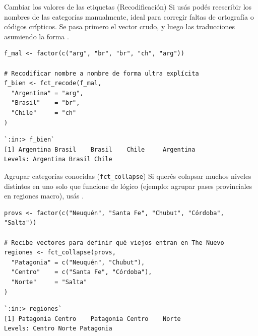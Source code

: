 \documentclass[8pt]{beamer}
\begin{document}
	\begin{frame}[fragile]{Cambiar los valores de las etiquetas (Recodificación)}
		Si usás  podés reescribir los nombres de las categorías manualmente, ideal para corregir faltas de ortografía o códigos crípticos. Se pasa primero el vector crudo, y luego las traducciones asumiendo la forma .
		
\begin{lstlisting}[style=RScript]
f_mal <- factor(c("arg", "br", "br", "ch", "arg"))

# Recodificar nombre a nombre de forma ultra explícita
f_bien <- fct_recode(f_mal,
  "Argentina" = "arg",
  "Brasil"    = "br",
  "Chile"     = "ch"
)
\end{lstlisting}
\begin{lstlisting}[style=RConsole]
`:in:> f_bien`
[1] Argentina Brasil    Brasil    Chile     Argentina
Levels: Argentina Brasil Chile
\end{lstlisting}
	\end{frame}

	\begin{frame}[fragile]{Agrupar categorías conocidas (\texttt{fct\_collapse})}
		Si querés colapsar muchos niveles distintos en uno solo que funcione de  lógico (ejemplo: agrupar pases provinciales en regiones macro), usás .
		
\begin{lstlisting}[style=RScript]
provs <- factor(c("Neuquén", "Santa Fe", "Chubut", "Córdoba", "Salta"))

# Recibe vectores para definir qué viejos entran en The Nuevo
regiones <- fct_collapse(provs,
  "Patagonia" = c("Neuquén", "Chubut"),
  "Centro"    = c("Santa Fe", "Córdoba"),
  "Norte"     = "Salta"
)
\end{lstlisting}
\begin{lstlisting}[style=RConsole]
`:in:> regiones`
[1] Patagonia Centro    Patagonia Centro    Norte    
Levels: Centro Norte Patagonia
\end{lstlisting}
	\end{frame}
\end{document}
